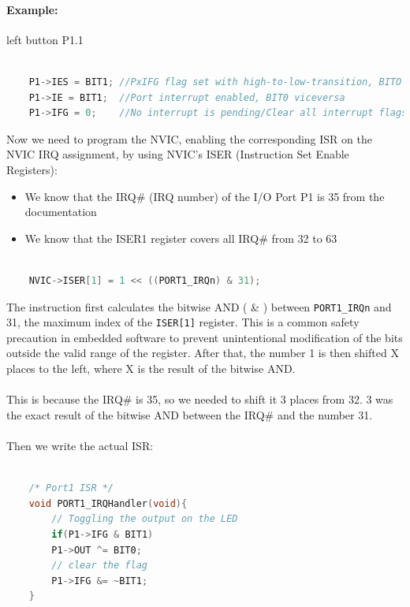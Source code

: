 \paragraph{Example: } left button P1.1
\begin{lstlisting}[language=c++]

    P1->IES = BIT1; //PxIFG flag set with high-to-low-transition, BITO viceversa
    P1->IE = BIT1;  //Port interrupt enabled, BIT0 viceversa
    P1->IFG = 0;    //No interrupt is pending/Clear all interrupt flags, 1 viceversa
\end{lstlisting}


Now we need to program the NVIC, enabling the corresponding ISR on the NVIC IRQ assignment, by
using NVIC's ISER (Instruction Set Enable Registers):

\begin{itemize}
    \item We know that the IRQ\# (IRQ number) of the I/O Port P1 is 35 from the documentation
    \item We know that the ISER1 register covers all IRQ\# from 32 to 63
\end{itemize}
\begin{lstlisting}[language=c++]

    NVIC->ISER[1] = 1 << ((PORT1_IRQn) & 31);
\end{lstlisting}


The instruction first calculates the bitwise AND ( \& ) between \verb|PORT1_IRQn| and 31, the maximum
index of the \verb|ISER[1]| register.
This is a common safety precaution in embedded software to prevent unintentional modification of
the bits outside the valid range of the register.
After that, the number 1 is then shifted X places to the left, where X is the result of the bitwise AND.

\paragraph{}
This is because the IRQ\# is 35, so we needed to shift it 3 places from 32. 3 was the exact result of the
bitwise AND between the IRQ\# and the number 31.

\paragraph{}
Then we write the actual ISR:


\begin{lstlisting}[language=c++]

    /* Port1 ISR */
    void PORT1_IRQHandler(void){
        // Toggling the output on the LED
        if(P1->IFG & BIT1)
        P1->OUT ^= BIT0;
        // clear the flag
        P1->IFG &= ~BIT1;
    }
\end{lstlisting}

